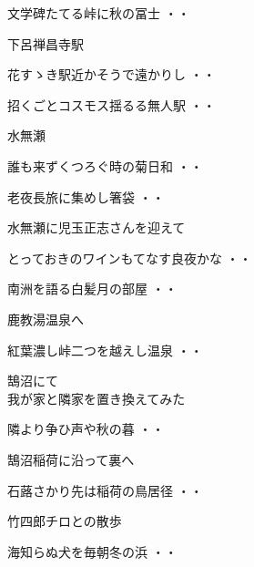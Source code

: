 \begin{shiika}文学碑たてる峠に秋の冨士
\hfill{・・}\end{shiika}
\vspace{ 0.4cm}
下呂禅昌寺駅
\begin{shiika}花すゝき駅近かそうで遠かりし
\hfill{・・}\end{shiika}
\begin{shiika}招くごとコスモス揺るる無人駅
\hfill{・・}\end{shiika}
\vspace{ 0.4cm}
水無瀬
\begin{shiika}誰も来ずくつろぐ時の菊日和
\hfill{・・}\end{shiika}
\vspace{ 0.4cm}
\begin{shiika}老夜長旅に集めし箸袋
\hfill{・・}\end{shiika}
\vspace{ 0.4cm}
水無瀬に児玉正志さんを迎えて
\begin{shiika}とっておきのワインもてなす良夜かな
\hfill{・・}\end{shiika}
\vspace{ 0.4cm}
\begin{shiika}南洲を語る白髪月の部屋
\hfill{・・}\end{shiika}
\vspace{ 0.4cm}
鹿教湯温泉へ
\begin{shiika}紅葉濃し峠二つを越えし温泉
\hfill{・・}\end{shiika}
\vspace{ 0.4cm}
鵠沼にて\\
我が家と隣家を置き換えてみた
\begin{shiika}隣より争ひ声や秋の暮
\hfill{・・}\end{shiika}
\vspace{ 0.4cm}
鵠沼稲荷に沿って裏へ
\begin{shiika}石蕗さかり先は稲荷の鳥居径
\hfill{・・}\end{shiika}
\vspace{ 0.4cm}
竹四郎チロとの散歩
\begin{shiika}海知らぬ犬を毎朝冬の浜
\hfill{・・}\end{shiika}
